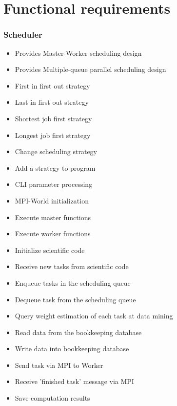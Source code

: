 {


\setcounter{func}{10}
\renewcommand{\labelitemi}{
	\ifnum \value{func}<10$/F 0\arabic{func} /$\addtocounter{func}{10}
	\else $/F \arabic{func} /$\addtocounter{func}{10}\fi
	}

\section{Functional requirements} 
	
	\subsubsection{Scheduler}
	
		\begin{itemize}
			\item Provides Master-Worker scheduling design 
			\item Provides Multiple-queue parallel scheduling design
			\item First in first out strategy
			\item Last in first out strategy
			\item Shortest job first strategy
			\item Longest job first strategy 
			\item Change scheduling strategy
			\item Add a strategy to program
			\item CLI parameter processing
			\item MPI-World initialization
			\item Execute master functions
			\item Execute worker functions
			\item Initialize scientific code
			\item Receive new tasks from scientific code
			\item Enqueue tasks in the scheduling queue
			\item Dequeue task from the scheduling queue%
			\item Query weight estimation of each task at data mining
			\item Read data from the bookkeeping database
			\item Write data into bookkeeping database
			\item Send task via MPI to Worker
			\item Receive 'finished task' message via MPI  
			\item Save computation results
		\end{itemize}
	
}

